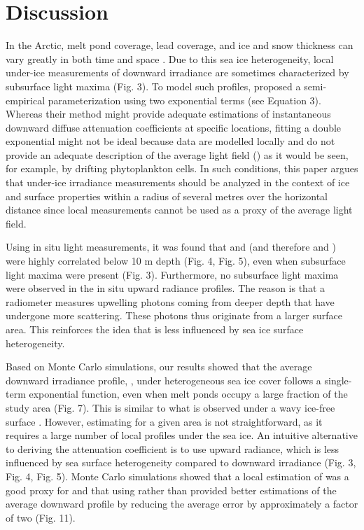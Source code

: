 \section{Discussion}

In the Arctic, melt pond coverage, lead coverage, and ice and snow thickness can vary greatly in both time and space \citep{Landy2014,Eicken2004}. Due to this sea ice heterogeneity, local under-ice measurements of downward irradiance are sometimes characterized by subsurface light maxima (Fig. 3). To model such profiles, \citet{Laney2017} proposed a semi-empirical parameterization using two exponential terms (see Equation 3). Whereas their method might provide adequate estimations of instantaneous downward diffuse attenuation coefficients at specific locations, fitting a double exponential might not be ideal because data are modelled locally and do not provide an adequate description of the average light field (\meanedz{}) as it would be seen, for example, by drifting phytoplankton cells. In such conditions, this paper argues that under-ice irradiance measurements should be analyzed in the context of ice and surface properties within a radius of several metres over the horizontal distance since local measurements cannot be used as a proxy of the average light field.

Using in situ light measurements, it was found that \ed{} and \lu{} (and therefore \ked{} and \klu{}) were highly correlated below 10 m depth (Fig. 4, Fig. 5), even when subsurface light maxima were present (Fig. 3). Furthermore, no subsurface light maxima were observed in the in situ upward radiance profiles. The reason is that a \lu{} radiometer measures upwelling photons coming from deeper depth that have undergone more scattering.  These photons thus originate from a larger surface area. This reinforces the idea that \lu{} is less influenced by sea ice surface heterogeneity. 

Based on Monte Carlo simulations, our results showed that the average downward irradiance profile, \meanedz{}, under heterogeneous sea ice cover follows a single-term exponential function, even when melt ponds occupy a large fraction of the study area (Fig. 7). This is similar to what is observed under a wavy ice-free surface \citep{Zaneveld2001}. However, estimating \meanedz{} for a given area is not straightforward, as it requires a large number of local profiles under the sea ice. An intuitive alternative to deriving the attenuation coefficient is to use upward radiance, which is less influenced by sea surface heterogeneity compared to downward irradiance (Fig. 3, Fig. 4, Fig. 5). Monte Carlo simulations showed that a local estimation of \klu{} was a good proxy for \meanked{} and that using \klu{} rather than \ked{} provided better estimations of the average downward profile by reducing the average error by approximately a factor of two (Fig. 11). 

